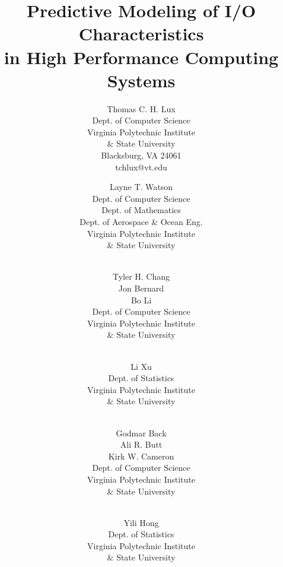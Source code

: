 \documentclass{scspaperproc}
\theoremstyle{scsthe}
\begin{document}

\def\SCSconferenceacro{SpringSim}
\def\SCSpublicationyear{2018}
\def\SCSconferencedates{April 15-18}
\def\SCSconferencevenue{Baltimore, MD, USA}
\def\SCSsymposiumacro{HPC} %

\title{Predictive Modeling of I/O Characteristics \\ in High
  Performance Computing Systems}

\author{Thomas C. H. Lux \\ [8pt]
Dept. of Computer Science \\
Virginia Polytechnic Institute\\
\& State University \\
Blacksburg, VA 24061 \\
tchlux@vt.edu \\
\and
Layne T. Watson \\[8pt]
Dept. of Computer Science\\
Dept. of Mathematics\\
Dept. of Aerospace \& Ocean Eng.\\ 
Virginia Polytechnic Institute\\
\& State University \\
\and
\vspace{-30pt}\\
Tyler H. Chang\\
Jon Bernard\\
Bo Li\\[8pt]
Dept. of Computer Science\\ 
Virginia Polytechnic Institute\\
\& State University \\
\and
\vspace{-30pt}\\
Li Xu\\[8pt]
Dept. of Statistics\\ 
Virginia Polytechnic Institute\\
\& State University \\
\and
\vspace{-30pt}\\
Godmar Back\\
Ali R. Butt\\
Kirk W. Cameron\\[8pt]
Dept. of Computer Science\\ 
Virginia Polytechnic Institute\\
\& State University \\
\and
\vspace{-30pt}\\
Yili Hong\\[8pt]
Dept. of Statistics\\ 
Virginia Polytechnic Institute\\
\& State University \\
}
\end{document}
